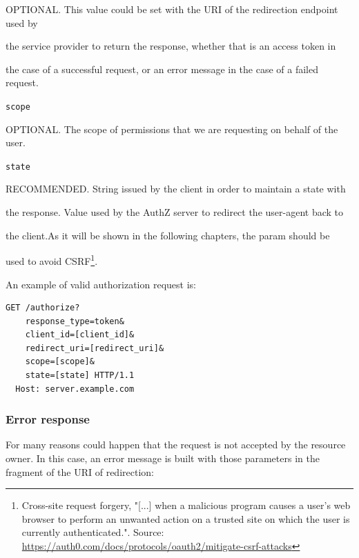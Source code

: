 \hspace{0.5cm}OPTIONAL. This value could be set with the URI of the redirection endpoint used by 

\hspace{0.5cm}the service provider to return the response, whether that is an access token in 

\hspace{0.5cm}the case of a successful request, or an error message in the case of a failed request.

\texttt{scope}

\hspace{0.5cm}OPTIONAL. The scope of permissions that we are requesting on behalf of the user.

\vspace{0.5cm}

\texttt{state}

\hspace{0.5cm}RECOMMENDED. String issued by the client in order to maintain a state with

\hspace{0.5cm}the response. Value used by the AuthZ server to redirect the user-agent back to

\hspace{0.5cm}the client.As it will be shown in the following chapters, the param should be

\hspace{0.5cm}used to avoid CSRF\footnote{Cross-site request forgery, "[...] when a malicious program causes a user's web browser to perform an unwanted action on a trusted site on which the user is currently authenticated.". Source: \url{https://auth0.com/docs/protocols/oauth2/mitigate-csrf-attacks}}.

\noindent An example of valid authorization request is:

\begin{lstlisting}[basicstyle=\ttfamily]
  GET /authorize?
    response_type=token&
    client_id=[client_id]&
    redirect_uri=[redirect_uri]&
    scope=[scope]&
    state=[state] HTTP/1.1
  Host: server.example.com
\end{lstlisting}
\subsubsection{Error response}
\label{tokenerr}
For many reasons could happen that the request is not accepted by the resource owner. In this case, an error message is built with those parameters in the fragment of the URI of redirection:

